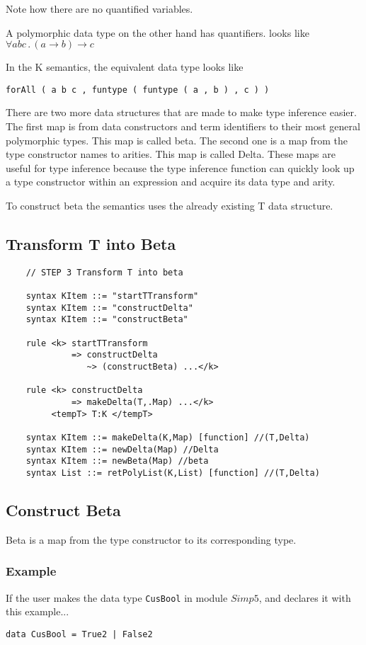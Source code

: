 Note how there are no quantified variables.

A polymorphic data type on the other hand has quantifiers. looks like $\forall a b c \, . \, (a \rightarrow b) \rightarrow c$

In the K semantics, the equivalent data type looks like
\begin{lstlisting}
forAll ( a b c , funtype ( funtype ( a , b ) , c ) )
\end{lstlisting}

There are two more data structures that are made to make type inference easier. The first map is from data constructors and term identifiers to their most general polymorphic types. This map is called beta. The second one is a map from the type constructor names to arities. This map is called Delta. These maps are useful for type inference because the type inference function can quickly look up a type constructor within an expression and acquire its data type and arity.

To construct beta the semantics uses the already existing T data structure.

\subsection{Transform T into Beta}
\begin{lstlisting}
    // STEP 3 Transform T into beta

    syntax KItem ::= "startTTransform"
    syntax KItem ::= "constructDelta"
    syntax KItem ::= "constructBeta"

    rule <k> startTTransform
             => constructDelta
                ~> (constructBeta) ...</k>

    rule <k> constructDelta
             => makeDelta(T,.Map) ...</k>
         <tempT> T:K </tempT>

    syntax KItem ::= makeDelta(K,Map) [function] //(T,Delta)
    syntax KItem ::= newDelta(Map) //Delta
    syntax KItem ::= newBeta(Map) //beta
    syntax List ::= retPolyList(K,List) [function] //(T,Delta)
\end{lstlisting}

\subsection{Construct Beta}
Beta is a map from the type constructor to its corresponding type.

\subsubsection{Example}
If the user makes the data type \texttt{CusBool} in module $Simp5$, and declares it with this example...
\begin{lstlisting}
data CusBool = True2 | False2
\end{lstlisting}

